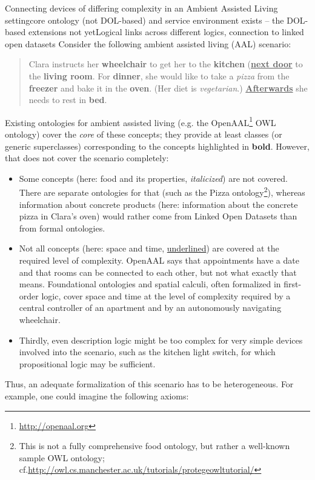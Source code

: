 \documentclass[%
\ifpretendfinal
final%
\else
draft%
\fi,
a4paper,
wd]{isov2}
\makeatletter
\newcommand*{\cf}{cf.\@\xspace}
\newcommand*{\eg}{e.g.\@\xspace}
\makeatother
\begin{document}
\begin{usecase}{Connecting devices of differing complexity in an Ambient Assisted Living setting}{core ontology (not DOL-based) and service environment exists – the DOL-based extensions not yet}{Logical links across different logics, connection to linked open datasets}
  Consider the following ambient assisted living (AAL) scenario:
  \begin{quote}
    Clara instructs her \textbf{wheelchair} to get her to the \textbf{kitchen} (\textbf{\underline{next door}} to the \textbf{living room}.  For \textbf{dinner}, she would like to take a \textit{pizza} from the \textbf{freezer} and bake it in the \textbf{oven}.  (Her diet is \textit{vegetarian}.)  \textbf{\underline{Afterwards}} she needs to rest in \textbf{bed}.
  \end{quote}
  Existing ontologies for ambient assisted living (\eg the OpenAAL\footnote{\url{http://openaal.org}} OWL ontology) cover the \emph{core} of these  concepts; they provide at least classes (or generic superclasses) corresponding to the concepts highlighted in \textbf{bold}.  However, that does not cover the scenario completely:
  \begin{itemize}
  \item Some concepts (here: food and its properties, \textit{italicized}) are not covered.  There are separate ontologies for that (such as the Pizza ontology\footnote{This is not a fully comprehensive food ontology, but rather a well-known sample OWL ontology; \cf \url{http://owl.cs.manchester.ac.uk/tutorials/protegeowltutorial/}}), whereas information about concrete products (here: information about the concrete pizza in Clara's oven) would rather come from Linked Open Datasets than from formal ontologies.
  \item Not all concepts (here: space and time, \underline{underlined}) are covered at the required level of complexity.  OpenAAL says that appointments have a date and that rooms can be connected to each other, but not what exactly that means.  Foundational ontologies and spatial calculi, often formalized in first-order logic, cover space and time at the level of complexity required by a central controller of an apartment and by an autonomously navigating wheelchair.
  \item Thirdly, even description logic might be too complex for very simple devices involved into the scenario, such as the kitchen light switch, for which propositional logic may be sufficient.
  \end{itemize}
  Thus, an adequate formalization of this scenario has to be heterogeneous.  For example, one could imagine the following axioms:

\end{usecase}
\end{document}
